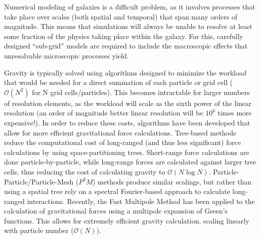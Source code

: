 Numerical modeling of galaxies is a difficult problem, as it involves processes
that take place over scales (both spatial and temporal) that span many orders of
magnitude.  This means that simulations will always be unable to resolve at
least some fraction of the physics taking place within the galaxy.  For this,
carefully designed ``sub-grid'' models are required to include the macroscopic
effects that unresolvable microscopic processes yield. 

Gravity is typically solved using algorithms designed to minimize the workload
that would be needed for a direct summation of each particle or grid cell
($\mathcal{O}(N^2)$ for N grid cells/particles).  This becomes intractable for
larger numbers of resolution elements, as the workload will scale as the sixth
power of the linear resolution (an order of magnitude better linear resolution
will be $10^6$ times more expensive!).  In order to reduce these costs,
algorithms have been developed that allow for more efficient gravitational
force calculations.  Tree-based methods \citep{Barnes1986} reduce the
computational cost of long-ranged (and thus less significant) force
calculations by using space-partitioning trees.  Short-range force calculations
are done particle-by-particle, while long-range forces are calculated against
larger tree cells, thus reducing the cost of calculating gravity to
$\mathcal{O}(N\log N)$.  Particle-Particle/Particle-Mesh ($P^3M$) methods
\citep{Couchman1991} produce similar scalings, but rather than using a
spatial tree rely on a spectral Fourier-based approach to calculate long-ranged
interactions.  Recently, the Fast Multipole Method \citep{Greengard1987} has
been applied to the calculation of gravitational forces
\citep{Dehnen2002,Hahn2013} using a multipole expansion of Green's functions.
This allows for extremely efficient gravity calculation, scaling linearly with
particle number ($\mathcal{O}(N)$).

